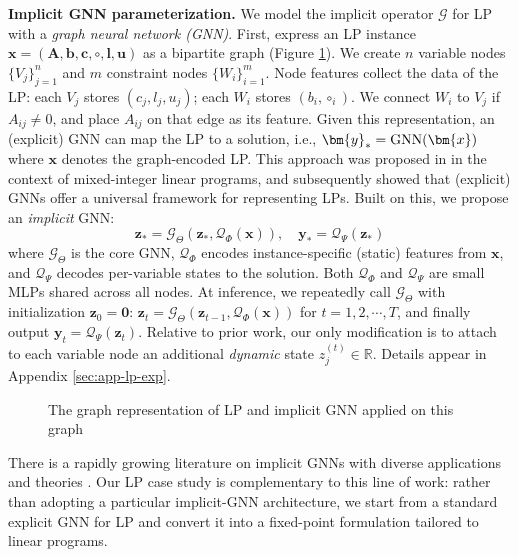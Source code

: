\documentclass{amsart} %
\def\vzero{{\bm{0}}}
\def\vb{{\bm{b}}}
\def\vc{{\bm{c}}}
\def\vl{{\bm{l}}}
\def\vu{{\bm{u}}}
\def\vx{{\bm{x}}}
\def\vy{{\bm{y}}}
\def\vz{{\bm{z}}}
\def\mA{{\bm{A}}}
\def\sR{{\mathbb{R}}}
\def\cG{{\mathcal{G}}}
\def\cQ{{\mathcal{Q}}}
\theoremstyle{definition}
\theoremstyle{remark}
\begin{document}
\textbf{Implicit GNN parameterization.} We model the implicit operator $\cG$ for LP with a \textit{graph neural network (GNN)}. First, express an LP instance $\vx=(\mA,\vb,\vc,\circ,\vl,\vu)$ as a bipartite graph (Figure \ref{fig:gnn-diagram}). We create $n$ variable nodes $\{V_j\}_{j=1}^n$ and $m$ constraint nodes $\{W_{i}\}_{i=1}^m$. Node features collect the data of the LP: each $V_j$ stores $(c_j,l_j,u_j)$; each $W_i$ stores $(b_i,\circ_i)$. We connect $W_i$ to $V_j$ if $A_{ij}\neq 0$, and place $A_{ij}$ on that edge as its feature. 
Given this representation, an (explicit) GNN can map the LP to a solution, i.e., $\vy_\ast=\textup{GNN}(\vx)$ where $\vx$ denotes the graph-encoded LP.
This approach was proposed in \cite{gasse2019exact} in the context of mixed-integer linear programs, and \cite{chen2023lp} subsequently showed that (explicit) GNNs offer a universal framework for representing LPs. Built on this, we propose an \emph{implicit} GNN: 
\begin{equation} 
\label{eq:gnn-structure} 
\vz_\ast = \cG_{\Theta}(\vz_\ast,\cQ_{\Phi}(\vx)), \quad \vy_\ast = \cQ_{\Psi}(\vz_\ast) 
\end{equation}
where $\cG_{\Theta}$ is the core GNN, $\cQ_{\Phi}$ encodes instance-specific (static) features from $\vx$, and $\cQ_{\Psi}$ decodes per-variable states to the solution. Both $\cQ_{\Phi}$ and $\cQ_{\Psi}$ are small MLPs shared across all nodes.
At inference, we repeatedly call $\cG_{\Theta}$ with initialization $\vz_0=\vzero$: $\vz_{t}=\cG_{\Theta}(\vz_{t-1},\cQ_{\Phi}(\vx))$ for $t=1,2,\cdots,T$, and finally output $\vy_t=\cQ_{\Psi}(\vz_t)$.  Relative to prior work, our only modification is to attach to each variable node an additional \emph{dynamic} state $z_j^{(t)} \in \sR$. Details appear in Appendix \ref{sec:app-lp-exp}.

\begin{figure}[t] %
    \centering
    \resizebox{\linewidth}{!}{}
    
    \caption{The graph representation of LP and implicit GNN applied on this graph}
    \label{fig:gnn-diagram}
\end{figure}


There is a rapidly growing literature on implicit GNNs with diverse applications and theories \cite{gu2020implicit,park2022convergent,chen2022efficient,chen2022optimization,baker2023implicit,lin2024ignn,nastorg2024implicit,zhong2024efficient,yang2025implicit}. Our LP case study is complementary to this line of work: rather than adopting a particular implicit-GNN architecture, we start from a standard explicit GNN for LP and convert it into a fixed-point formulation tailored to linear programs.
\end{document}
